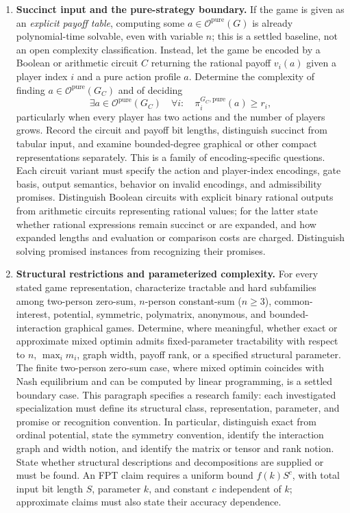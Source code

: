 \documentclass[11pt,a4paper]{article}
\begin{document}
\begin{enumerate}[label=\textbf{(\Alph*)},leftmargin=2.7em]
\item \textbf{Succinct input and the pure-strategy boundary.}
If the game is given as an \emph{explicit payoff table}, computing some $a\in\mathcal O^{\mathrm{pure}}(G)$ is already polynomial-time solvable, even with variable $n$; this is a settled baseline, not an open complexity classification. Instead, let the game be encoded by a Boolean or arithmetic circuit $C$ returning the rational payoff $v_i(a)$ given a player index $i$ and a pure action profile $a$. Determine the complexity of finding $a\in\mathcal O^{\mathrm{pure}}(G_C)$ and of deciding
\[
\exists a\in\mathcal O^{\mathrm{pure}}(G_C)
\quad\forall i:\quad \pi_i^{G_C,\mathrm{pure}}(a)\ge r_i,
\]
particularly when every player has two actions and the number of players grows. Record the circuit and payoff bit lengths, distinguish succinct from tabular input, and examine bounded-degree graphical or other compact representations separately. This is a family of encoding-specific questions. Each circuit variant must specify the action and player-index encodings, gate basis, output semantics, behavior on invalid encodings, and admissibility promises. Distinguish Boolean circuits with explicit binary rational outputs from arithmetic circuits representing rational values; for the latter state whether rational expressions remain succinct or are expanded, and how expanded lengths and evaluation or comparison costs are charged. Distinguish solving promised instances from recognizing their promises.

\item \textbf{Structural restrictions and parameterized complexity.}
For every stated game representation, characterize tractable and hard subfamilies among two-person zero-sum, $n$-person constant-sum ($n\ge3$), common-interest, potential, symmetric, polymatrix, anonymous, and bounded-interaction graphical games. Determine, where meaningful, whether exact or approximate mixed optimin admits fixed-parameter tractability with respect to $n$, $\max_i m_i$, graph width, payoff rank, or a specified structural parameter. The finite two-person zero-sum case, where mixed optimin coincides with Nash equilibrium and can be computed by linear programming, is a settled boundary case. This paragraph specifies a research family: each investigated specialization must define its structural class, representation, parameter, and promise or recognition convention. In particular, distinguish exact from ordinal potential, state the symmetry convention, identify the interaction graph and width notion, and identify the matrix or tensor and rank notion. State whether structural descriptions and decompositions are supplied or must be found. An FPT claim requires a uniform bound $f(k)S^c$, with total input bit length $S$, parameter $k$, and constant $c$ independent of $k$; approximate claims must also state their accuracy dependence.


\end{enumerate}
\end{document}
